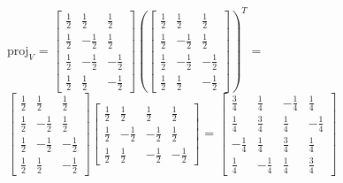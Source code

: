 \begin{tbox}
        \hspace{0.5cm}
        $\text{proj}_V$ =
        \scriptsize
        $\begin{bmatrix}
            \frac{1}{2} & \frac{1}{2} & \frac{1}{2} \\
            \frac{1}{2} & -\frac{1}{2} & \frac{1}{2} \\
            \frac{1}{2} & -\frac{1}{2} & -\frac{1}{2} \\
            \frac{1}{2} & \frac{1}{2} & -\frac{1}{2}
        \end{bmatrix}
        (\begin{bmatrix}
            \frac{1}{2} & \frac{1}{2} & \frac{1}{2} \\
            \frac{1}{2} & -\frac{1}{2} & \frac{1}{2} \\
            \frac{1}{2} & -\frac{1}{2} & -\frac{1}{2} \\
            \frac{1}{2} & \frac{1}{2} & -\frac{1}{2}
        \end{bmatrix})^T$ =
        $\begin{bmatrix}
            \frac{1}{2} & \frac{1}{2} & \frac{1}{2} \\
            \frac{1}{2} & -\frac{1}{2} & \frac{1}{2} \\
            \frac{1}{2} & -\frac{1}{2} & -\frac{1}{2} \\
            \frac{1}{2} & \frac{1}{2} & -\frac{1}{2}
        \end{bmatrix}
        \begin{bmatrix}
            \frac{1}{2} & \frac{1}{2} & \frac{1}{2} & \frac{1}{2} \\
            \frac{1}{2} & -\frac{1}{2} & -\frac{1}{2} & \frac{1}{2} \\
            \frac{1}{2} & \frac{1}{2} & -\frac{1}{2} & -\frac{1}{2}
        \end{bmatrix}$ =
        $\begin{bmatrix}
            \frac{3}{4} & \frac{1}{4} & -\frac{1}{4} & \frac{1}{4} \\
            \frac{1}{4} & \frac{3}{4} & \frac{1}{4} & -\frac{1}{4} \\
            -\frac{1}{4} & \frac{1}{4} & \frac{3}{4} & \frac{1}{4} \\
            \frac{1}{4} & -\frac{1}{4} & \frac{1}{4} & \frac{3}{4}
        \end{bmatrix}$
    \end{tbox}

    \newpage





